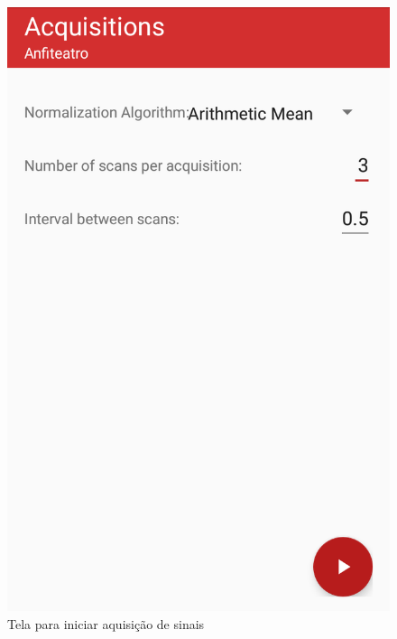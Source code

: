 \begin{figure}[H]
  \centering
  \begin{minipage}[b]{0.4\textwidth}
    \includegraphics[width=\textwidth]{imagens/screenshots/newMeasure.png}
    \caption{Tela para iniciar aquisição de sinais}
  \end{minipage}
  \hfill
  \begin{minipage}[b]{0.4\textwidth}

\end{minipage}
\end{figure}
